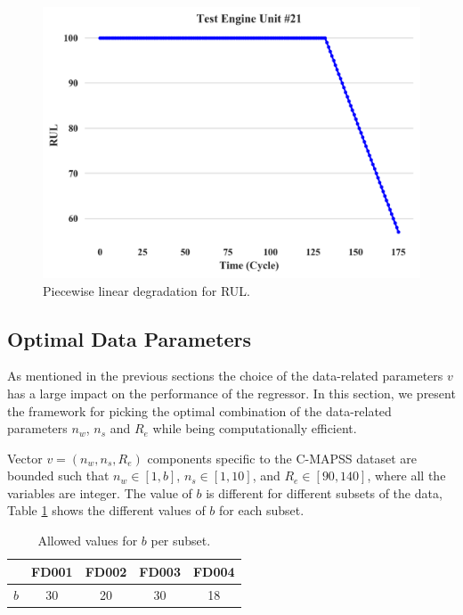 \documentclass[preprint,12pt]{elsarticle}%
\begin{document}
\begin{figure}[!htb]
\begin{center}
\includegraphics[scale=0.5]{Figures/test_engine.png}
\caption{Piecewise linear degradation for RUL.}
\label{FigRULinear}
\end{center}
\end{figure}

\subsection{Optimal Data Parameters}

\label{sec:otimal_data_params}

As mentioned in the previous sections the choice of the data-related
parameters $v$ has a large impact on the performance of the regressor. In this
section, we present the framework for picking the optimal combination of the
data-related parameters $n_{w}$, $n_{s}$ and $R_{e}$ while being
computationally efficient.

Vector $v = (n_{w}, n_{s}, R_{e})$ components specific to the C-MAPSS dataset are
bounded such that $n_{w} \in\left[  1, b\right]  $, $n_{s} \in\left[  1,
10\right]  $, and $R_{e} \in\left[  90, 140 \right]  $, where all the
variables are integer. The value of $b$ is different for different subsets of
the data, Table \ref{table:b_values} shows the different values of $b$ for
each subset.

\begin{table}[!htb]
\begin{center}
\begin{tabular}
[c]{c|cccc}\hline
& FD001 & FD002 & FD003 & FD004\\\hline
$b$ & 30 & 20 & 30 & 18\\\hline
\end{tabular}
\caption{Allowed values for $b$ per subset.}
\label{table:b_values}
\end{center}
\end{table}
\end{document}
